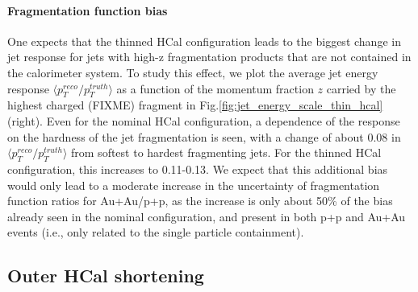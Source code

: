 \paragraph{Fragmentation function bias} 
One expects that the thinned HCal configuration leads to the biggest change in jet response for jets with high-z fragmentation products that
are not contained in the calorimeter system. To study this effect, we plot the average jet energy response 
$\langle p_T^{reco}/p_T^{truth}\rangle$ as a function of the momentum fraction $z$ carried by the highest \pt charged (FIXME) 
fragment in Fig.\ref{fig:jet_energy_scale_thin_hcal}(right). Even for the nominal HCal configuration, a dependence of the response on the hardness of the jet fragmentation
is seen, with a change of about 0.08 in $\langle p_T^{reco}/p_T^{truth}\rangle$ from softest to hardest fragmenting jets. 
For the thinned HCal configuration, this increases to 0.11-0.13. We expect that this additional bias would only lead to a moderate 
increase in the uncertainty of fragmentation function ratios for Au+Au/p+p, as the increase is only about 50\% of the 
bias already seen in the nominal configuration, and present in both p+p and Au+Au events (i.e., only related to the 
single particle containment). 


\subsection{Outer HCal shortening}

